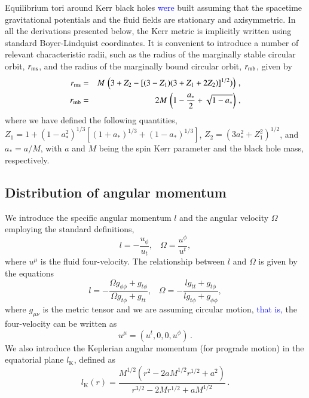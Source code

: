 \documentclass{aa}
\newcommand{\sg}[1]{\textcolor{blue}{#1}}
\begin{document}
Equilibrium tori around Kerr black holes \sg{were} built assuming that the spacetime gravitational potentials and the fluid fields are stationary and axisymmetric. In all the derivations presented below, the Kerr metric is implicitly written using standard Boyer-Lindquist coordinates. It is convenient to introduce a number of relevant characteristic radii, such as the radius
of the marginally stable circular orbit, $r_{\rm ms}$, and the radius of the marginally bound circular orbit, $r_{\rm mb}$, given by
\begin{eqnarray}
r_{\rm ms} &=& M\,\left(3+Z_2-\left[(3-Z_1)(3+Z_1+2Z_2)\right]^{1/2})\right)\,,
\\
r_{\rm mb} &=& 2M\,\left(  1-\frac{a_*}{2} + \sqrt{1-a_*} \right)\,,
\end{eqnarray}
where we have defined the following quantities, $Z_1=1+(1-a_*^2)^{1/3}[(1+a_*)^{1/3}+(1-a_*)^{1/3}]$, $Z_2=(3a_*^2+Z_1^2)^{1/2}$, and $a_*=a/M$, with $a$ and $M$ being the spin Kerr parameter and the black hole mass, respectively.

\subsection{Distribution of angular momentum}

We introduce the specific angular momentum $l$ and the angular velocity $\Omega$ employing the standard definitions,
\begin{equation}
l = - \frac{u_{\phi}}{u_t}, \;\;\; \Omega = \frac{u^{\phi}}{u^t},
\end{equation}
where $u^{\mu}$ is the fluid four-velocity.
The relationship between $l$ and $\Omega$ is given by the equations
\begin{equation}
l = - \frac{\Omega g_{\phi\phi} + g_{t\phi}}{\Omega g_{t\phi} + g_{tt}}, \;\;\; \Omega = - \frac{l g_{tt} + g_{t\phi}}{l g_{t\phi} + g_{\phi\phi}},
\end{equation}
where $g_{\mu\nu}$ is the metric tensor and we are assuming circular motion, \sg{that is,} the four-velocity can be written as
\begin{equation}
u^{\mu} = (u^t, 0, 0, u^{\phi})\,.
\end{equation}
We also introduce the Keplerian angular momentum (for prograde motion) in the equatorial plane $l_{\mathrm{K}}$, defined as 
\begin{equation}\label{eq:kepler}
l_{\mathrm{K}}(r) = \frac{M^{1/2}(r^{2}-2aM^{1/2}r^{1/2}+a^{2})}{r^{3/2}-2Mr^{1/2}+aM^{1/2}}\,.
\end{equation}
\end{document}
